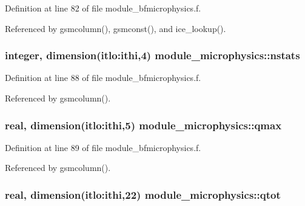 Definition at line 82 of file module\+\_\+bfmicrophysics.\+f.



Referenced by gsmcolumn(), gsmconst(), and ice\+\_\+lookup().

\subsubsection[{\texorpdfstring{nstats}{nstats}}]{\setlength{\rightskip}{0pt plus 5cm}integer, dimension(itlo\+:ithi,4) module\+\_\+microphysics\+::nstats}\hypertarget{namespacemodule__microphysics_a8893b7e5e0d04741a7e155c999480f92}{}\label{namespacemodule__microphysics_a8893b7e5e0d04741a7e155c999480f92}


Definition at line 88 of file module\+\_\+bfmicrophysics.\+f.



Referenced by gsmcolumn().

\subsubsection[{\texorpdfstring{qmax}{qmax}}]{\setlength{\rightskip}{0pt plus 5cm}real, dimension(itlo\+:ithi,5) module\+\_\+microphysics\+::qmax}\hypertarget{namespacemodule__microphysics_ae783e9f9007b2cc25590b9e967461ef7}{}\label{namespacemodule__microphysics_ae783e9f9007b2cc25590b9e967461ef7}


Definition at line 89 of file module\+\_\+bfmicrophysics.\+f.



Referenced by gsmcolumn().

\subsubsection[{\texorpdfstring{qtot}{qtot}}]{\setlength{\rightskip}{0pt plus 5cm}real, dimension(itlo\+:ithi,22) module\+\_\+microphysics\+::qtot}\hypertarget{namespacemodule__microphysics_a1ca8e1d6e01d0b1bfb406608ccfeff5d}{}\label{namespacemodule__microphysics_a1ca8e1d6e01d0b1bfb406608ccfeff5d}


